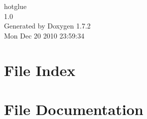 \documentclass[a4paper]{book}
\begin{document}
\hypersetup{pageanchor=false}
\begin{titlepage}
\vspace*{7cm}
\begin{center}
{\Large hotglue \\[1ex]\large 1.0 }\\
\vspace*{1cm}
{\large Generated by Doxygen 1.7.2}\\
\vspace*{0.5cm}
{\small Mon Dec 20 2010 23:59:34}\\
\end{center}
\end{titlepage}
\clearemptydoublepage
{}
\tableofcontents
\clearemptydoublepage
{}
\hypersetup{pageanchor=true}
\chapter{File Index}

\chapter{File Documentation}























\printindex
\end{document}
